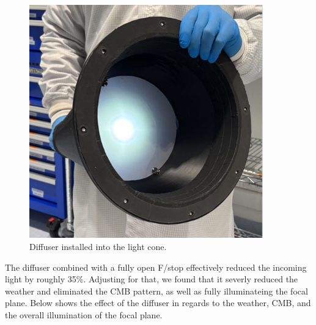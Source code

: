 \begin{figure}
\centering
\includegraphics[width=0.9\textwidth]{sections/figures/Diffuser.jpg}
\caption{Diffuser installed into the light cone.}
\end{figure}

The diffuser combined with a fully open F/stop effectively reduced the
incoming light by roughly 35\%. Adjusting for that, we found that it
severly reduced the \textquotesingle weather\textquotesingle{} and
eliminated the CMB pattern, as well as fully illuminateing the focal
plane. Below shows the effect of the diffuser in regards to the weather,
CMB, and the overall illumination of the focal plane.

